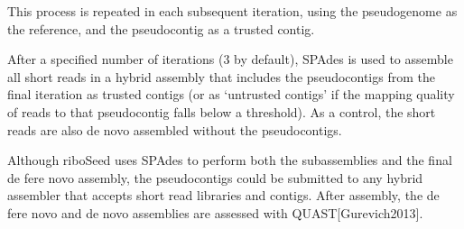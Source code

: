 \documentclass[11pt]{article}
\begin{document}
\begin{linenumbers}
This process is repeated in each subsequent iteration, using the pseudogenome as the reference, and the pseudocontig as a trusted contig.


After a specified number of iterations (3 by default), SPAdes is used to assemble all short reads in a hybrid assembly that includes the pseudocontigs from the final iteration as trusted contigs (or as ‘untrusted contigs’ if the mapping quality of reads to that pseudocontig falls below a threshold). As a control, the short reads are also de novo assembled without the pseudocontigs.


Although riboSeed uses SPAdes to perform both the subassemblies and the final de fere novo assembly, the pseudocontigs could be submitted to any hybrid assembler that accepts short read libraries and contigs. After assembly, the de fere novo and de novo assemblies are assessed with QUAST[Gurevich2013].


\end{linenumbers}
\end{document}
